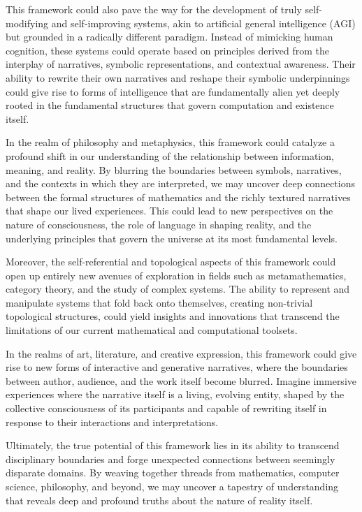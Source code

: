 \documentclass{article}
\begin{document}
This framework could also pave the way for the development of truly self-modifying and self-improving systems, akin to artificial general intelligence (AGI) but grounded in a radically different paradigm. Instead of mimicking human cognition, these systems could operate based on principles derived from the interplay of narratives, symbolic representations, and contextual awareness. Their ability to rewrite their own narratives and reshape their symbolic underpinnings could give rise to forms of intelligence that are fundamentally alien yet deeply rooted in the fundamental structures that govern computation and existence itself.

In the realm of philosophy and metaphysics, this framework could catalyze a profound shift in our understanding of the relationship between information, meaning, and reality. By blurring the boundaries between symbols, narratives, and the contexts in which they are interpreted, we may uncover deep connections between the formal structures of mathematics and the richly textured narratives that shape our lived experiences. This could lead to new perspectives on the nature of consciousness, the role of language in shaping reality, and the underlying principles that govern the universe at its most fundamental levels.

Moreover, the self-referential and topological aspects of this framework could open up entirely new avenues of exploration in fields such as metamathematics, category theory, and the study of complex systems. The ability to represent and manipulate systems that fold back onto themselves, creating non-trivial topological structures, could yield insights and innovations that transcend the limitations of our current mathematical and computational toolsets.

In the realms of art, literature, and creative expression, this framework could give rise to new forms of interactive and generative narratives, where the boundaries between author, audience, and the work itself become blurred. Imagine immersive experiences where the narrative itself is a living, evolving entity, shaped by the collective consciousness of its participants and capable of rewriting itself in response to their interactions and interpretations.

Ultimately, the true potential of this framework lies in its ability to transcend disciplinary boundaries and forge unexpected connections between seemingly disparate domains. By weaving together threads from mathematics, computer science, philosophy, and beyond, we may uncover a tapestry of understanding that reveals deep and profound truths about the nature of reality itself.
\end{document}
